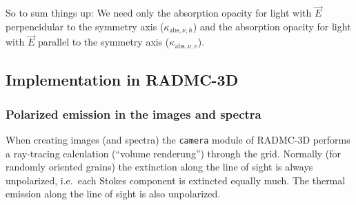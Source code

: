 \documentclass{report}
\begin{document}
So to sum things up: We need only the absorption opacity for light with
$\vec E$ perpencidular to the symmetry axis ($\kappa_{\mathrm{abs},\nu,h}$)
and the absorption opacity for light with $\vec E$ parallel to the symmetry
axis ($\kappa_{\mathrm{abs},\nu,v}$).



\subsection{Implementation in RADMC-3D}
\subsubsection{Polarized emission in the images and spectra}
When creating images (and spectra) the {\small\tt camera} module of RADMC-3D
performs a ray-tracing calculation (``volume renderung'') through the grid.
Normally (for randomly oriented grains) the extinction along the line of
sight is always unpolarized, i.e.\ each Stokes component is extincted
equally much. The thermal emission along the line of sight is also
unpolarized. 
\end{document}
